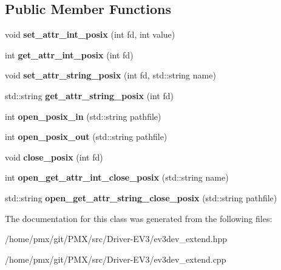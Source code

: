 \subsection*{Public Member Functions}
\begin{DoxyCompactItemize}
\item 
\mbox{\label{classdevice__extend_ad9002ff74d39bc7dccae5ea3e20a874e}} 
void {\bfseries set\+\_\+attr\+\_\+int\+\_\+posix} (int fd, int value)
\item 
\mbox{\label{classdevice__extend_a159fa2e401259ed3d689e83d8e4fe3de}} 
int {\bfseries get\+\_\+attr\+\_\+int\+\_\+posix} (int fd)
\item 
\mbox{\label{classdevice__extend_ad22a6dccdbea5a6bd36f4c2fc358f990}} 
void {\bfseries set\+\_\+attr\+\_\+string\+\_\+posix} (int fd, std\+::string name)
\item 
\mbox{\label{classdevice__extend_a52a07043769b1a9a4390f88295da5c9f}} 
std\+::string {\bfseries get\+\_\+attr\+\_\+string\+\_\+posix} (int fd)
\item 
\mbox{\label{classdevice__extend_a4a0631585e8d16ab2461d7eed4c02235}} 
int {\bfseries open\+\_\+posix\+\_\+in} (std\+::string pathfile)
\item 
\mbox{\label{classdevice__extend_a8faf9842f60319f0a90250bebb611e0e}} 
int {\bfseries open\+\_\+posix\+\_\+out} (std\+::string pathfile)
\item 
\mbox{\label{classdevice__extend_a1aab2bd9f45ccac261a706471ad7c910}} 
void {\bfseries close\+\_\+posix} (int fd)
\item 
\mbox{\label{classdevice__extend_a5c572f57652817e90bdb13b8063e87b1}} 
int {\bfseries open\+\_\+get\+\_\+attr\+\_\+int\+\_\+close\+\_\+posix} (std\+::string name)
\item 
\mbox{\label{classdevice__extend_a141a01165789359a88605c1faf3d459a}} 
std\+::string {\bfseries open\+\_\+get\+\_\+attr\+\_\+string\+\_\+close\+\_\+posix} (std\+::string pathfile)
\end{DoxyCompactItemize}


The documentation for this class was generated from the following files\+:\begin{DoxyCompactItemize}
\item 
/home/pmx/git/\+P\+M\+X/src/\+Driver-\/\+E\+V3/ev3dev\+\_\+extend.\+hpp\item 
/home/pmx/git/\+P\+M\+X/src/\+Driver-\/\+E\+V3/ev3dev\+\_\+extend.\+cpp\end{DoxyCompactItemize}

